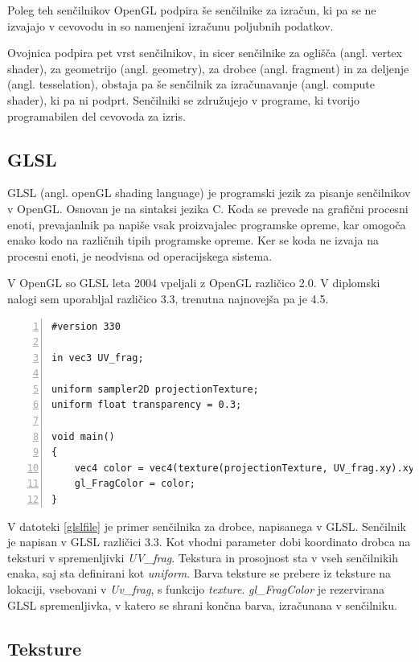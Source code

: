 \documentclass[a4paper, 12pt]{book}
\begin{document}
Poleg teh senčilnikov OpenGL podpira še senčilnike za izračun, ki pa se ne izvajajo v cevovodu in so namenjeni izračunu poljubnih podatkov.

Ovojnica podpira pet vrst senčilnikov, in sicer senčilnike za oglišča (angl. vertex shader), za geometrijo (angl. geometry), za drobce (angl. fragment) in za deljenje (angl. tesselation), obstaja pa še senčilnik za izračunavanje (angl. compute shader), ki pa ni podprt. Senčilniki se združujejo v programe, ki tvorijo programabilen del cevovoda za izris.

\subsection*{GLSL}

GLSL (angl. openGL shading language) je programski jezik za pisanje senčilnikov v OpenGL. Osnovan je na sintaksi jezika C. Koda se prevede na grafični procesni enoti, prevajanlnik pa napiše vsak proizvajalec programske opreme, kar omogoča enako kodo na različnih tipih programske opreme. Ker se koda ne izvaja na procesni enoti, je neodvisna od operacijskega sistema.

V OpenGL so GLSL leta 2004 vpeljali z OpenGL različico 2.0. V diplomski nalogi sem uporabljal različico 3.3, trenutna najnovejša pa je 4.5. 
\begin{lstlisting}[captionpos=b, frame=single, caption={Primer preprostega senčilnika za drobce.}, breaklines=true, firstline=1, numbers=left, label={glslfile}]
#version 330

in vec3 UV_frag; 

uniform sampler2D projectionTexture;
uniform float transparency = 0.3;

void main()
{
	vec4 color = vec4(texture(projectionTexture, UV_frag.xy).xyz, transparency);
	gl_FragColor = color;
}	
\end{lstlisting}

V datoteki \ref{glslfile} je primer senčilnika za drobce, napisanega v GLSL. Senčilnik je napisan v GLSL različici 3.3. Kot vhodni parameter dobi koordinato drobca na teksturi v spremenljivki \emph{UV\_frag}. Tekstura in prosojnost sta v vseh senčilnikih enaka, saj sta definirani kot \emph{uniform}. Barva teksture se prebere iz teksture na lokaciji, vsebovani v \emph{Uv\_frag}, s funkcijo \emph{texture}. \emph{gl\_FragColor} je rezervirana GLSL spremenljivka, v katero se shrani končna barva, izračunana v senčilniku.
\subsection*{Teksture}
\end{document}
